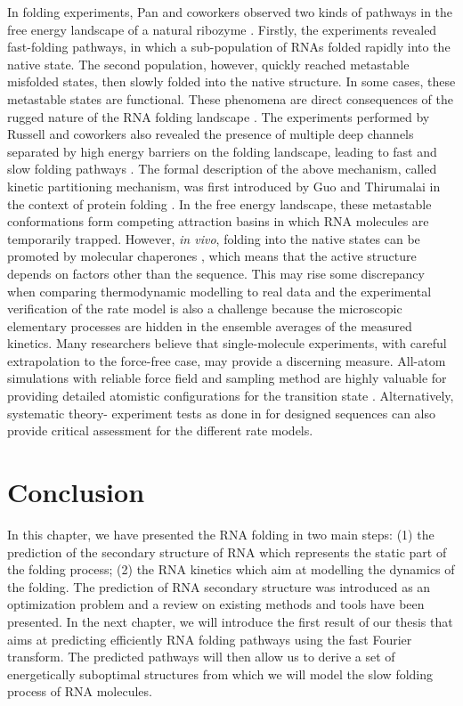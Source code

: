 In folding experiments, Pan and coworkers observed two kinds of pathways in the free energy landscape of a natural ribozyme \cite{pan97_foldin_rna_invol_paral_pathw}. Firstly, the experiments revealed fast-folding pathways, in which a sub-population of RNAs folded rapidly into the native state. The second population, however, quickly reached metastable misfolded states, then slowly folded into the native structure. In some cases, these metastable states are functional. These phenomena are direct consequences of the rugged nature of the RNA folding landscape \cite{solomatin10_multip_nativ_states_reveal_persis}. The experiments performed by Russell and coworkers also revealed the presence of multiple deep channels separated by high energy barriers on the folding landscape, leading to fast and slow folding pathways \cite{russell2002exploring}. The formal description of the above mechanism, called kinetic partitioning mechanism, was first introduced by Guo and Thirumalai in the context of protein folding \cite{guo95_kinet_protein_foldin}. In the free energy landscape, these metastable conformations form competing attraction basins in which RNA molecules are temporarily trapped. However, \textit{in vivo}, folding into the native states can be promoted by molecular chaperones \cite{chakrabarti2017molecular}, which means that the active structure depends on factors other than the sequence. This may rise some discrepancy when comparing thermodynamic modelling to real data and the experimental verification of the rate model is also a challenge because the microscopic elementary processes are hidden in the ensemble averages of the measured kinetics.
Many researchers believe that single-molecule experiments, with careful extrapolation to the force-free case, may provide a discerning measure. All-atom simulations with reliable force field and sampling method are highly valuable for providing detailed atomistic configurations for the transition state \cite{chen2008rna}. Alternatively, systematic theory- experiment tests as done in \cite{zhang06_explor_compl_foldin_kinet_rna_hairp} for designed sequences can also provide critical assessment for the different rate models.


\section{Conclusion}
In this chapter, we have presented the RNA folding in two main steps: (1) the prediction of the secondary structure of RNA which represents the static part of the folding process; (2) the RNA kinetics which  aim at modelling the dynamics of the folding. The prediction of RNA secondary structure was introduced as an optimization problem and a review on existing methods and tools have been presented. In the next chapter, we will introduce the first result of our thesis that aims at predicting efficiently RNA folding pathways using the fast Fourier transform. The predicted pathways will then allow us to derive a set of energetically suboptimal structures from which we will model the slow folding process of RNA molecules.

